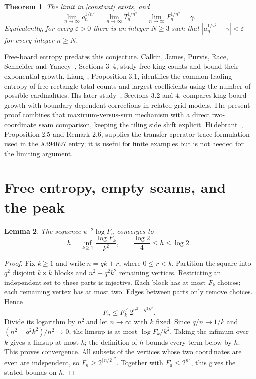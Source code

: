 \documentclass[10pt]{article}
\newtheorem{theorem}{Theorem}
\newtheorem{lemma}[theorem]{Lemma}
\newcommand{\gam}{\gamma}
\begin{document}
\begin{theorem}\label{main}
The limit in \eqref{constant} exists, and
\[
 \lim_{n\to\infty}a_n^{1/n^2}
 =\lim_{n\to\infty}T_n^{1/n^2}
 =\lim_{n\to\infty}F_n^{1/n^2}=\gam.
\]
Equivalently, for every $\varepsilon>0$ there is an integer $N\geq3$
such that $|a_n^{1/n^2}-\gam|<\varepsilon$ for every integer $n\geq N$.
\end{theorem}

Free-board entropy predates this conjecture. Calkin, James, Purvis, Race,
Schneider and Yancey~\cite{kings}, Sections 3--4, study free king counts
and bound their exponential growth. Liang~\cite{liang}, Proposition 3.1,
identifies the common leading entropy of free-rectangle total counts and
largest coefficients using the number of possible cardinalities. His
later study~\cite{liang2}, Sections 3.2 and 4, compares king-board growth
with boundary-dependent corrections in related grid models. The present
proof combines that maximum-versus-sum mechanism with a direct
two-coordinate seam comparison, keeping the tiling side shift explicit.
Hildebrant~\cite{hildebrant}, Proposition 2.5 and Remark 2.6, supplies the transfer-operator
trace formulation used in the A394697 entry; it is useful for finite
examples but is not needed for the limiting argument.

\section{Free entropy, empty seams, and the peak}
\begin{lemma}\label{entropy}
The sequence $n^{-2}\log F_n$ converges to
\[
 h=\inf_{k\geq1}\frac{\log F_k}{k^2},\qquad
 \frac{\log2}{4}\leq h\leq\log2.
\]
\end{lemma}
\begin{proof}
Fix $k\geq1$ and write $n=qk+r$, where $0\leq r<k$.
Partition the square into $q^2$ disjoint $k\times k$ blocks and
$n^2-q^2k^2$ remaining vertices. Restricting an independent set to
these parts is injective. Each block has at most $F_k$ choices;
each remaining vertex has at most two. Edges between parts only
remove choices. Hence
\[
 F_n\leq F_k^{q^2}\,2^{n^2-q^2k^2}.
\]
Divide its logarithm by $n^2$ and let $n\to\infty$ with $k$ fixed.
Since $q/n\to1/k$ and $(n^2-q^2k^2)/n^2\to0$, the limsup is at
most $\log F_k/k^2$. Taking the infimum over $k$ gives a limsup
at most $h$; the definition of $h$ bounds every term below by $h$.
This proves convergence. All subsets of the vertices whose two
coordinates are even are independent, so
$F_n\geq2^{\lceil n/2\rceil^2}$. Together with $F_n\leq2^{n^2}$,
this gives the stated bounds on $h$.
\end{proof}
\end{document}

